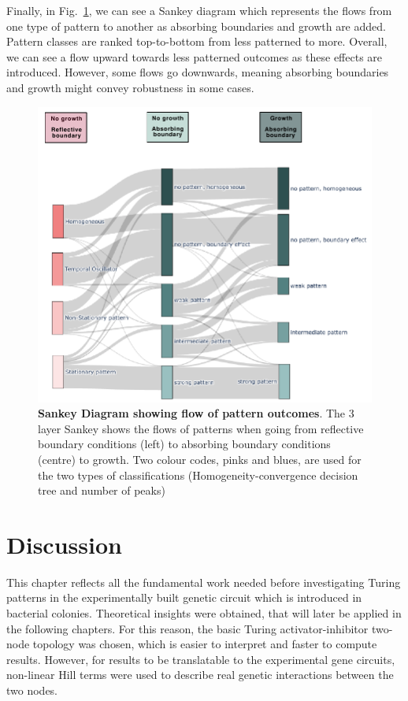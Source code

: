 Finally, in Fig.~\ref{fig:3layer_sankey}, we can see a Sankey diagram which represents the flows from one type of pattern to another as absorbing boundaries and growth are added.
Pattern classes are ranked top-to-bottom from less patterned to more.
Overall, we can see a flow upward towards less patterned outcomes as these effects are introduced.
However, some flows go downwards, meaning absorbing boundaries and growth might convey robustness in some cases.

\begin{figure}[H] %
    \centering
    \begin{adjustbox}{center}
        \includegraphics[width=1\textwidth]{chapters/Chapter 1/3layer_sankey} %
    \end{adjustbox}
    \caption{\textbf{Sankey Diagram showing flow of pattern outcomes}. The 3 layer Sankey shows the flows of patterns when going from reflective boundary conditions (left) to absorbing boundary conditions (centre) to growth. Two colour codes, pinks and blues, are used for the two types of classifications (Homogeneity-convergence decision tree and number of peaks)}
    \label{fig:3layer_sankey} %
\end{figure}


\section{Discussion}
This chapter reflects all the fundamental work needed before investigating Turing patterns in the experimentally built genetic circuit which is introduced in bacterial colonies.
Theoretical insights were obtained, that will later be applied in the following chapters.
For this reason, the basic Turing activator-inhibitor two-node topology was chosen, which is easier to interpret and faster to compute results.
However, for results to be translatable to the experimental gene circuits, non-linear Hill terms were used to describe real genetic interactions between the two nodes.

